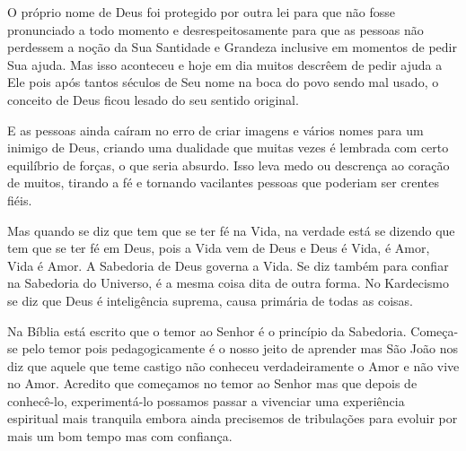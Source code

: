 \emdash{}O próprio nome de Deus foi protegido por outra lei para que não fosse pronunciado a todo momento e desrespeitosamente para que as pessoas não perdessem a noção da Sua Santidade e Grandeza inclusive em momentos de pedir Sua ajuda. Mas isso aconteceu e hoje em dia muitos descrêem de pedir ajuda a Ele pois após tantos séculos de Seu nome na boca do povo sendo mal usado, o conceito de Deus ficou lesado do seu sentido original.

\emdash{}E as pessoas ainda caíram no erro de criar imagens e vários nomes para um inimigo de Deus, criando uma dualidade que muitas vezes é lembrada com certo equilíbrio de forças, o que seria absurdo. Isso leva medo ou descrença ao coração de muitos, tirando a fé e tornando vacilantes pessoas que poderiam ser crentes fiéis.

\emdash{}Mas quando se diz que tem que se ter fé na Vida, na verdade está se dizendo que tem que se ter fé em Deus, pois a Vida vem de Deus e Deus é Vida, é Amor, Vida é Amor. A Sabedoria de Deus governa a Vida. Se diz também para confiar na Sabedoria do Universo, é a mesma coisa dita de outra forma. No Kardecismo se diz que Deus é inteligência suprema, causa primária de todas as coisas. 

\emdash{}Na Bíblia está escrito que o temor ao Senhor é o princípio da Sabedoria. Começa-se pelo temor pois pedagogicamente é o nosso jeito de aprender mas São João nos diz que aquele que teme castigo não conheceu verdadeiramente o Amor e não vive no Amor. Acredito que começamos no temor ao Senhor mas que depois de conhecê-lo, experimentá-lo possamos passar a vivenciar uma experiência espiritual mais tranquila embora ainda precisemos de tribulações para evoluir por mais um bom tempo mas com confiança.